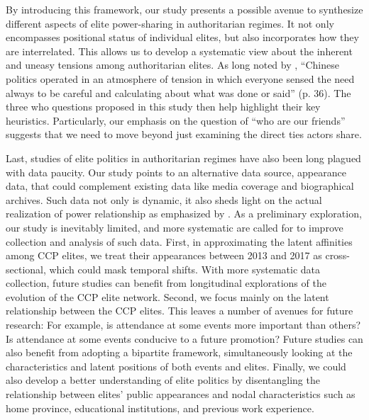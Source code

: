 \documentclass[11pt,english]{article}
\begin{document}
\begin{flushleft}
By introducing this framework, our study presents a possible avenue to synthesize different aspects of elite power-sharing in authoritarian regimes. It not only encompasses positional status of individual elites, but also incorporates how they are interrelated. This allows us to develop a systematic view about the inherent and uneasy tensions among authoritarian elites. As long noted by \citet{Pye1995}, ``Chinese politics operated in an atmosphere of tension in which everyone sensed the need always to be careful and calculating about what was done or said'' (p. 36). The three who questions proposed in this study then help highlight their key heuristics. Particularly, our emphasis on the question of ``who are our friends'' suggests that we need to move beyond just examining the direct ties actors share.

Last, studies of elite politics in authoritarian regimes have also been long plagued with data paucity. Our study points to an alternative data source, appearance data, that could complement existing data like media coverage and biographical archives. Such data not only is dynamic, it also sheds light on the actual realization of power relationship as emphasized by \citet{Dahl1961}. As a preliminary exploration, our study is inevitably limited, and more systematic are called for to improve collection and analysis of such data.  First, in approximating the latent affinities among CCP elites, we treat their appearances between 2013 and 2017 as cross-sectional, which could mask temporal shifts.  With more systematic data collection, future studies can benefit from longitudinal explorations of the evolution of the CCP elite network.  Second, we focus mainly on the latent relationship between the CCP elites.  This leaves a number of avenues for future research:  For example, is attendance at some events more important than others?  Is attendance at some events conducive to a future promotion?  Future studies can also benefit from adopting a bipartite framework, simultaneously looking at the characteristics and latent positions of both events and elites.  Finally, we could also develop a better understanding of elite politics by disentangling the relationship between elites' public appearances and nodal characteristics such as home province, educational institutions, and previous work experience.

\newpage{}

\begin{spacing}{1}




\end{spacing}

\par\end{flushleft}
\end{document}
